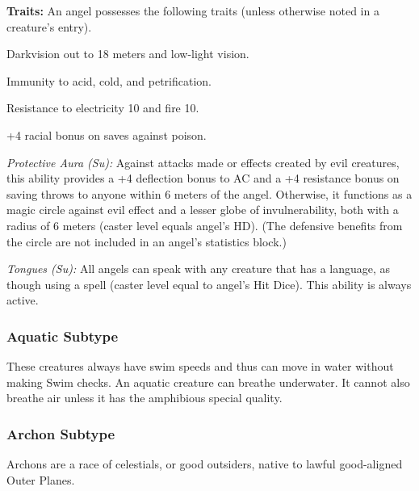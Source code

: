 \textbf{Traits:} An angel possesses the following traits (unless otherwise noted in a creature's entry).
\begin{itemize*}
\item Darkvision out to 18 meters and low-light vision.
\item Immunity to acid, cold, and petrification.
\item Resistance to electricity 10 and fire 10.
\item +4 racial bonus on saves against poison.
\item \textit{Protective Aura (Su):} Against attacks made or effects created by evil creatures, this ability provides a +4 deflection bonus to AC and a +4 resistance bonus on saving throws to anyone within 6 meters of the angel. Otherwise, it functions as a magic circle against evil effect and a lesser globe of invulnerability, both with a radius of 6 meters (caster level equals angel's HD). (The defensive benefits from the circle are not included in an angel's statistics block.)
\item \textit{Tongues (Su):} All angels can speak with any creature that has a language, as though using a  spell (caster level equal to angel's Hit Dice). This ability is always active.
\end{itemize*}

\subsubsection{Aquatic Subtype}
These creatures always have swim speeds and thus can move in water without making Swim checks. An aquatic creature can breathe underwater. It cannot also breathe air unless it has the amphibious special quality.

\subsubsection{Archon Subtype}
Archons are a race of celestials, or good outsiders, native to lawful good-aligned Outer Planes.

